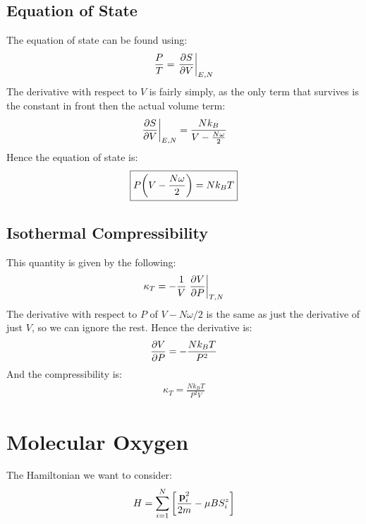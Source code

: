 \documentclass[12pt]{article}
\begin{document}
\subsection{Equation of State}
The equation of state can be found using:
\begin{align*}
  \frac{P}{T}=\eval{\pdv{S}{V}}_{E,N}
\end{align*}
The derivative with respect to $V$ is fairly simply, as the only term that survives is the constant in front then the actual volume term:
\begin{align*}
  \eval{\pdv{S}{V}}_{E,N}=\frac{Nk_B}{V-\frac{N\omega}{2}}
\end{align*}
Hence the equation of state is:
\begin{align}
  \boxed{P\qty(V-\frac{N\omega}{2})=Nk_BT}
\end{align}
\subsection{Isothermal Compressibility}
This quantity is given by the following:
\begin{align*}
  \kappa_T=-\frac1V\eval{\pdv{V}{P}}_{T,N}
\end{align*}
The derivative with respect to $P$ of $V-N\omega/2$ is the same as just the derivative of just $V$, so we can ignore the rest. Hence the derivative is:
\begin{align*}
  \pdv{V}{P}=-\frac{Nk_BT}{P^2}
\end{align*}
And the compressibility is:
\begin{align}
  \boxed{\kappa_T=\frac{Nk_BT}{P^2V}}
\end{align}
\section{Molecular Oxygen}
The Hamiltonian we want to consider:
\begin{align*}
  H=\sum_{i=1}^N\qty[\frac{\vb{p}_i^2}{2m}-\mu BS_i^z]
\end{align*}
\end{document}
